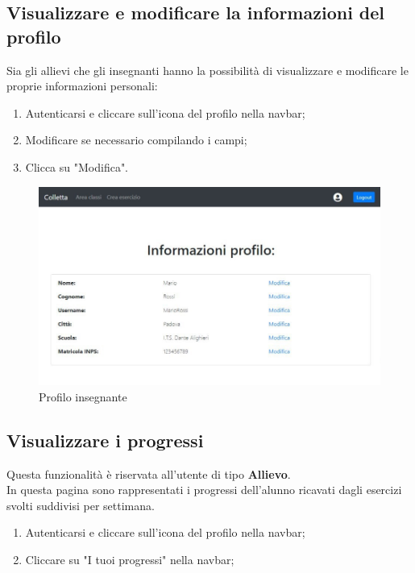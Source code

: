 \documentclass[11pt,a4paper]{article}
\begin{document}
{	\subsection{Visualizzare e modificare la informazioni del profilo}
	Sia gli allievi che gli insegnanti hanno la possibilità di visualizzare e modificare le proprie informazioni personali:
	\begin{enumerate}
		\item Autenticarsi e cliccare sull'icona del profilo nella navbar;
		\item Modificare se necessario compilando i campi;
		\item Clicca su "Modifica".
	\end{enumerate}
\newpage
	\begin{figure}[h]
		\centering
		\includegraphics[scale=0.65]{images/profiloinsegnante.jpg}
		\caption{Profilo insegnante}
	\end{figure}
	
	
	\subsection{Visualizzare i progressi}
	Questa funzionalità è riservata all'utente di tipo \textbf{Allievo}.\\
	In questa pagina sono rappresentati i progressi dell'alunno ricavati dagli esercizi svolti suddivisi per settimana.
	
	\begin{enumerate}
		\item Autenticarsi e cliccare sull'icona del profilo nella navbar;
		\item Cliccare su "I tuoi progressi" nella navbar;
	\end{enumerate}

}
\end{document}
